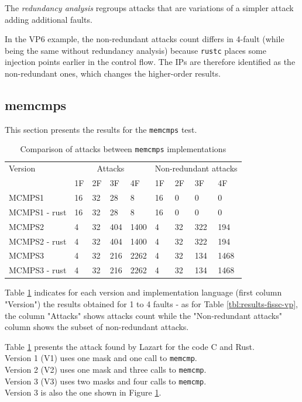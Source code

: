 The \textit{redundancy analysis} regroups attacks that are variations of a simpler attack adding additional faults.

In the VP6 example, the non-redundant attacks count differs in 4-fault (while being the same without redundancy analysis) because \texttt{rustc} places some injection points earlier in the control flow. The IPs are therefore identified as the non-redundant ones, which changes the higher-order results.
\subsection{memcmps}
\label{section:memcmps_result}
This section presents the results for the \texttt{memcmps} test.

\begin{table}[t]
\centering
\begin{tabular}{l|llll|llll}
Version      & \multicolumn{4}{c|}{Attacks} & \multicolumn{4}{c}{Non-redundant attacks} \\
             & 1F & 2F & 3F & 4F & 1F & 2F & 3F & 4F \\
\hline
\hline
MCMPS1        & 16  & 32  & 28  & 8  & 16  & 0  & 0  & 0  \\
MCMPS1 - rust & 16  & 32  & 28  & 8  & 16  & 0  & 0  & 0  \\
\hline
MCMPS2        & 4  & 32  & 404  & 1400 & 4  & 32  & 322  & 194  \\
MCMPS2 - rust & 4  & 32  & 404  & 1400 & 4  & 32  & 322  & 194  \\
\hline
MCMPS3        & 4  & 32  & 216  & 2262   & 4  & 32  & 134  & 1468  \\
MCMPS3 - rust & 4  & 32  & 216  & 2262   & 4  & 32  & 134  & 1468  \\
\end{tabular}
\caption{Comparison of attacks between \texttt{memcmps} implementations \label{tbl:results-fissc-mcmp}}
\end{table}

Table \ref{tbl:results-fissc-mcmp} indicates for each version and implementation language (first column "Version") the results obtained for 1 to 4 faults - as for Table \ref{tbl:results-fissc-vp}, the column "Attacks" shows attacks count while the "Non-redundant attacks" column shows the subset of non-redundant attacks.


Table \ref{tbl:results-fissc-mcmp} presents the attack found by Lazart for the code C and Rust.\\
Version 1 (V1) uses one mask and one call to \texttt{memcmp}.\\
Version 2 (V2) uses one mask and three calls to \texttt{memcmp}.\\
Version 3 (V3) uses two masks and four calls to \texttt{memcmp}.\\
Version 3 is also the one shown in Figure \ref{tbl:results-fissc-mcmp}.\\

